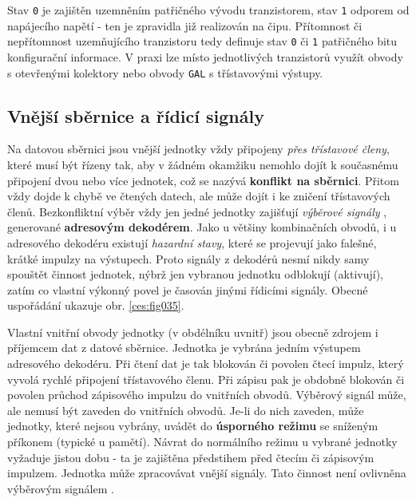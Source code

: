        
      Stav \texttt{0} je zajištěn uzemněním patřičného vývodu tranzistorem, stav \texttt{1} odporem 
      od napájecího napětí - ten je zpravidla již realizován na čipu. Přítomnost či nepřítomnost 
      uzemňujícího tranzistoru tedy definuje stav \texttt{0} či \texttt{1} patřičného bitu 
      konfigurační informace. V praxi lze místo jednotlivých tranzistorů využít obvody s otevřenými 
      kolektory nebo obvody \texttt{GAL} s třístavovými výstupy.
      
    \subsection{Vnější sběrnice a řídicí signály}\label{MIT:chap_extbus_sign}
      Na datovou sběrnici jsou vnější jednotky vždy připojeny \emph{přes třístavové členy}, které 
      musí být řízeny tak, aby v žádném okamžiku nemohlo dojít k současnému připojení dvou nebo 
      více jednotek, což se nazývá \textbf{konflikt na sběrnici}. Přitom vždy dojde k chybě ve 
      čtených datech, ale může dojít i ke zničení třístavových členů. Bezkonfliktní výběr vždy jen 
      jedné jednotky zajišťují \emph{výběrové signály} , generované 
      \textbf{adresovým dekodérem}. Jako u většiny kombinačních obvodů, i u adresového dekodéru 
      existují \emph{hazardní stavy}, které se projevují jako falešné, krátké impulzy na výstupech. 
      Proto signály z dekodérů nesmí nikdy samy spouštět činnost jednotek, nýbrž jen vybranou 
      jednotku odblokují (aktivují), zatím co vlastní výkonný povel je časován jinými řídicími 
      signály. Obecné uspořádání ukazuje obr. \ref{ces:fig035}.
      
      
      Vlastní vnitřní obvody jednotky (v obdélníku uvnitř) jsou obecně zdrojem i příjemcem dat z 
      datové sběrnice. Jednotka je vybrána jedním výstupem adresového dekodéru. Při čtení dat je 
      tak blokován či povolen čtecí impulz, který vyvolá rychlé připojení třístavového členu. Při 
      zápisu pak je obdobně blokován či povolen průchod zápisového impulzu do vnitřních obvodů. 
      Výběrový signál může, ale nemusí být zaveden do vnitřních obvodů. 
      Je-li do nich zaveden, může jednotky, které nejsou vybrány, uvádět do \textbf{úsporného 
      režimu} se sníženým příkonem (typické u pamětí). Návrat do normálního režimu u vybrané 
      jednotky vyžaduje jistou dobu - ta je zajištěna předstihem  před 
      čtecím či zápisovým impulzem. Jednotka může zpracovávat vnější signály. Tato činnost není 
      ovlivněna výběrovým signálem .
      
